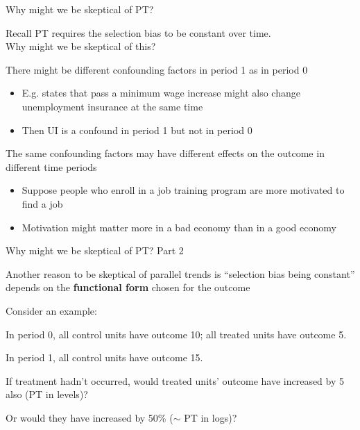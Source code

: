 \documentclass[aspectratio = 169, 13pt]{beamer}
\begin{document}
\begin{frame}{Why might we be skeptical of PT?}
	\begin{wideitemize}
		\item
		Recall PT requires the selection bias to be constant over time.\\
		Why might we be skeptical of this? 
		
		\pause
		\item
		There might be different confounding factors in period 1 as in period 0 
		\begin{itemize}
			\item
			E.g. states that pass a minimum wage increase might also change unemployment insurance at the same time
			
			\item
			Then UI is a confound in period 1 but not in period 0
		\end{itemize}
		
		\pause
		\item
		The same confounding factors may have different effects on the outcome in different time periods
		\begin{itemize}
			\item
			Suppose people who enroll in a job training program are more motivated to find a job
			
			\item
			Motivation might matter more in a bad economy than in a good economy
		\end{itemize}
	\end{wideitemize}
\end{frame}


\begin{frame}{Why might we be skeptical of PT? Part 2}
	\begin{wideitemize}
		\item
		Another reason to be skeptical of parallel trends is ``selection bias being constant'' depends on the \textbf{functional form} chosen for the outcome
		
		\item
		Consider an example: 
		\begin{wideitemize}
			\item 
			In period 0, all control units have outcome 10;  all treated units have outcome 5.
			
			\item
			In period 1, all control units have outcome 15.
			
			\item
			If treatment hadn't occurred, would treated units' outcome have increased by 5 also (PT in levels)? 
			
			\item
			Or would they have increased by 50\% ($\sim$ PT in logs)?
			
		\end{wideitemize} 
		
	\end{wideitemize}
\end{frame}
\end{document}
